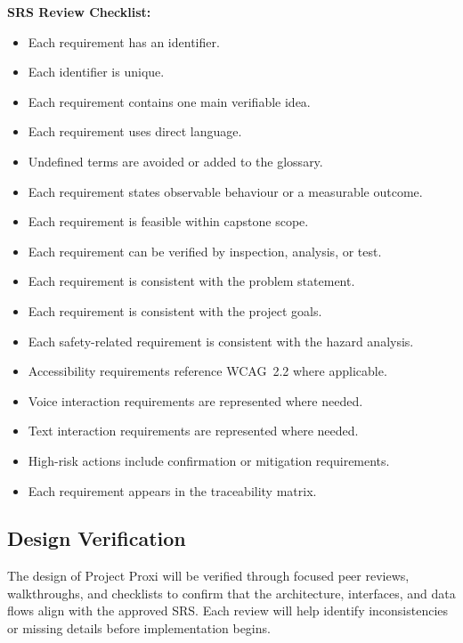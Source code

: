 \documentclass[12pt, titlepage]{article}
\begin{document}
\vspace{0.5em}
\noindent\textbf{SRS Review Checklist:}
\begin{itemize}
\item Each requirement has an identifier.
\item Each identifier is unique.
\item Each requirement contains one main verifiable idea.
\item Each requirement uses direct language.
\item Undefined terms are avoided or added to the glossary.
\item Each requirement states observable behaviour or a measurable outcome.
\item Each requirement is feasible within capstone scope.
\item Each requirement can be verified by inspection, analysis, or test.
\item Each requirement is consistent with the problem statement.
\item Each requirement is consistent with the project goals.
\item Each safety-related requirement is consistent with the hazard analysis.
\item Accessibility requirements reference WCAG~2.2 where applicable.
\item Voice interaction requirements are represented where needed.
\item Text interaction requirements are represented where needed.
\item High-risk actions include confirmation or mitigation requirements.
\item Each requirement appears in the traceability matrix.
\end{itemize}

\subsection{Design Verification}

The design of Project Proxi will be verified through focused peer reviews,
walkthroughs, and checklists to confirm that the architecture, interfaces,
and data flows align with the approved SRS. Each review will help identify
inconsistencies or missing details before implementation begins.
\end{document}

